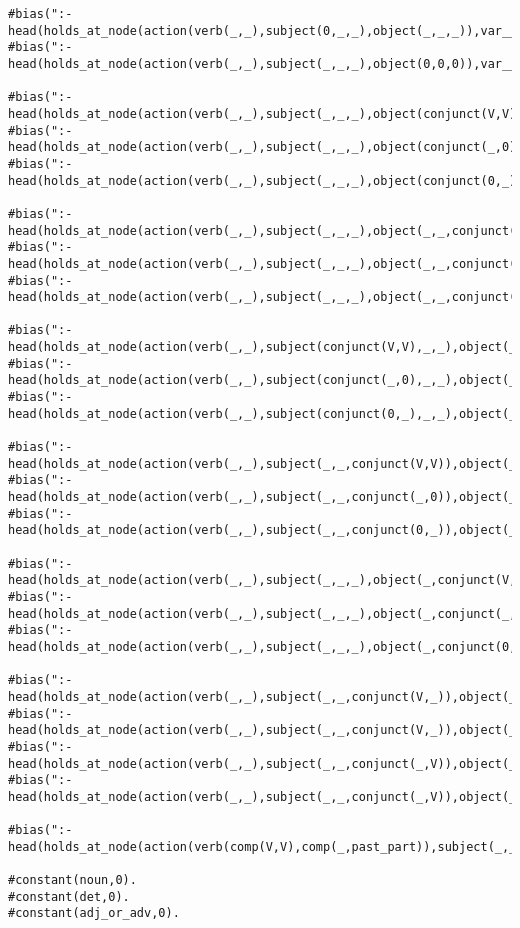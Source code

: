 \begin{lstlisting}
#bias(":- head(holds_at_node(action(verb(_,_),subject(0,_,_),object(_,_,_)),var__(1))).").
#bias(":- head(holds_at_node(action(verb(_,_),subject(_,_,_),object(0,0,0)),var__(1))).").

#bias(":- head(holds_at_node(action(verb(_,_),subject(_,_,_),object(conjunct(V,V),_,_)),var__(1))).").
#bias(":- head(holds_at_node(action(verb(_,_),subject(_,_,_),object(conjunct(_,0),_,_)),var__(1))).").
#bias(":- head(holds_at_node(action(verb(_,_),subject(_,_,_),object(conjunct(0,_),_,_)),var__(1))).").

#bias(":- head(holds_at_node(action(verb(_,_),subject(_,_,_),object(_,_,conjunct(V,V))),var__(1))).").
#bias(":- head(holds_at_node(action(verb(_,_),subject(_,_,_),object(_,_,conjunct(_,0))),var__(1))).").
#bias(":- head(holds_at_node(action(verb(_,_),subject(_,_,_),object(_,_,conjunct(0,_))),var__(1))).").

#bias(":- head(holds_at_node(action(verb(_,_),subject(conjunct(V,V),_,_),object(_,_,_)),var__(1))).").
#bias(":- head(holds_at_node(action(verb(_,_),subject(conjunct(_,0),_,_),object(_,_,_)),var__(1))).").
#bias(":- head(holds_at_node(action(verb(_,_),subject(conjunct(0,_),_,_),object(_,_,_)),var__(1))).").

#bias(":- head(holds_at_node(action(verb(_,_),subject(_,_,conjunct(V,V)),object(_,_,_)),var__(1))).").
#bias(":- head(holds_at_node(action(verb(_,_),subject(_,_,conjunct(_,0)),object(_,_,_)),var__(1))).").
#bias(":- head(holds_at_node(action(verb(_,_),subject(_,_,conjunct(0,_)),object(_,_,_)),var__(1))).").

#bias(":- head(holds_at_node(action(verb(_,_),subject(_,_,_),object(_,conjunct(V,V),_)),var__(1))).").
#bias(":- head(holds_at_node(action(verb(_,_),subject(_,_,_),object(_,conjunct(_,0),_)),var__(1))).").
#bias(":- head(holds_at_node(action(verb(_,_),subject(_,_,_),object(_,conjunct(0,_),_)),var__(1))).").

#bias(":- head(holds_at_node(action(verb(_,_),subject(_,_,conjunct(V,_)),object(_,_,conjunct(V,_))),var__(1))).").
#bias(":- head(holds_at_node(action(verb(_,_),subject(_,_,conjunct(V,_)),object(_,_,conjunct(_,V))),var__(1))).").
#bias(":- head(holds_at_node(action(verb(_,_),subject(_,_,conjunct(_,V)),object(_,_,conjunct(V,_))),var__(1))).").
#bias(":- head(holds_at_node(action(verb(_,_),subject(_,_,conjunct(_,V)),object(_,_,conjunct(_,V))),var__(1))).").

#bias(":- head(holds_at_node(action(verb(comp(V,V),comp(_,past_part)),subject(_,_,_),object(0,0,0)),var__(1))).").

#constant(noun,0).
#constant(det,0).
#constant(adj_or_adv,0).
\end{lstlisting}

